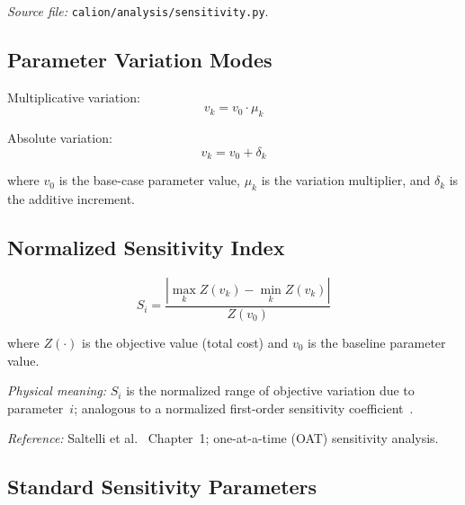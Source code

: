 \documentclass[a4paper,12pt]{article}
\begin{document}
\textit{Source file:} \texttt{calion/analysis/sensitivity.py}.

\subsection{Parameter Variation Modes}

\noindent Multiplicative variation:
\begin{equation}
  v_k = v_0 \cdot \mu_k
  \tag{SA-1}
  \label{eq:sa1}
\end{equation}

\noindent Absolute variation:
\begin{equation}
  v_k = v_0 + \delta_k
  \tag{SA-2}
  \label{eq:sa2}
\end{equation}

where $v_0$ is the base-case parameter value, $\mu_k$ is the variation multiplier, and
$\delta_k$ is the additive increment.

\subsection{Normalized Sensitivity Index}

\begin{equation}
  S_i
  = \frac{|\max_k Z(v_k) - \min_k Z(v_k)|}{Z(v_0)}
  \tag{SA-3}
  \label{eq:sa3}
\end{equation}

where $Z(\cdot)$ is the objective value (total cost) and $v_0$ is the baseline parameter value.

\noindent\textit{Physical meaning:} $S_i$ is the normalized range of objective variation due to
parameter~$i$; analogous to a normalized first-order sensitivity
coefficient~\cite{Saltelli2008}.

\noindent\textit{Reference:} Saltelli et al.~\cite{Saltelli2008} Chapter~1; one-at-a-time (OAT)
sensitivity analysis.

\subsection{Standard Sensitivity Parameters}
\end{document}
